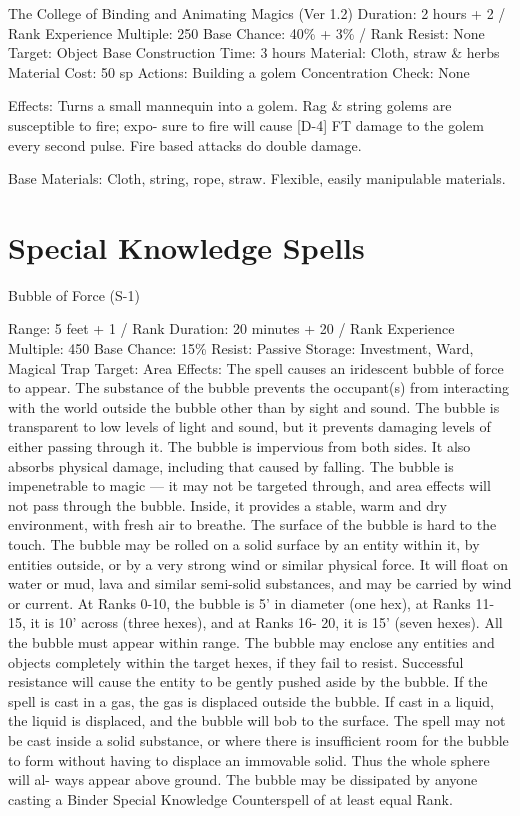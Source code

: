 \begin{Chapter}{The College of Binding and Animating Magics (Ver 1.2)}
Duration: 2 hours + 2 / Rank 
Experience Multiple: 250 
Base Chance: 40\% + 3\% / Rank 
Resist: None 
Target: Object 
Base Construction Time: 3 hours 
Material: Cloth, straw \& herbs  
Material Cost: 50 sp 
Actions: Building a golem 
Concentration Check: None 

Effects:  Turns  a  small  mannequin  into  a  golem. 
Rag  \&  string  golems are  susceptible  to  fire;  expo-
sure  to  fire  will  cause  [D-4]  FT  damage  to  the 
golem  every  second  pulse.  Fire  based  attacks  do 
double damage. 

Base Materials: Cloth, string, rope, straw. Flexible, 
easily manipulable materials. 

\section{Special Knowledge Spells}

Bubble of Force (S-1) 

Range: 5 feet + 1 / Rank 
Duration: 20 minutes + 20 / Rank 
Experience Multiple: 450 
Base Chance: 15\%
Resist: Passive 
Storage: Investment, Ward, Magical Trap 
Target: Area 
Effects:  The  spell  causes  an  iridescent  bubble  of 
force  to  appear.  The  substance  of  the  bubble  prevents  the  occupant(s)  from  interacting  with  the 
world  outside  the  bubble  other  than  by  sight  and 
sound.  The  bubble  is  transparent  to  low  levels  of 
light and sound, but it prevents damaging levels of 
either passing through it. The bubble is impervious 
from  both  sides.  It  also  absorbs  physical  damage, 
including  that  caused  by  falling.  The  bubble  is 
impenetrable  to  magic  —  it  may  not  be  targeted 
through, and area effects  will not pass through the 
bubble.  Inside,  it  provides  a  stable,  warm  and  dry 
environment, with fresh air to breathe. The surface 
of the bubble is hard to the touch. The bubble may 
be  rolled  on  a  solid  surface  by  an  entity  within  it, 
by  entities  outside,  or  by  a  very  strong  wind  or 
similar  physical  force.  It  will  float  on  water  or 
mud,  lava  and  similar  semi-solid  substances,  and 
may be carried by wind or current. At Ranks 0-10, 
the bubble is 5’ in diameter (one hex), at Ranks 11-
15, it is 10’ across (three hexes), and at Ranks 16-
20,  it  is  15’  (seven  hexes).  All  the  bubble  must 
appear  within  range.  The  bubble  may  enclose  any 
entities  and  objects  completely  within  the  target 
hexes,  if  they  fail  to  resist.  Successful  resistance 
will  cause  the  entity  to  be  gently  pushed  aside  by 
the  bubble.  If  the  spell  is  cast  in  a  gas,  the  gas  is 
displaced outside the bubble. If cast in a liquid, the 
liquid  is  displaced,  and  the  bubble  will  bob  to  the 
surface.  The  spell  may  not  be  cast  inside  a  solid 
substance,  or  where  there  is  insufficient  room  for 
the  bubble  to  form  without  having  to  displace  an 
immovable  solid.  Thus  the  whole  sphere  will  al-
ways  appear  above  ground.  The  bubble  may  be 
dissipated  by  anyone  casting  a  Binder  Special 
Knowledge Counterspell of at least equal Rank. 


\end{Chapter}
